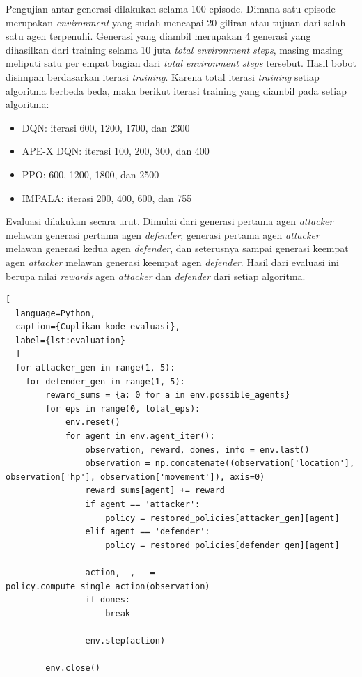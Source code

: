 Pengujian antar generasi dilakukan selama 100 episode.
Dimana satu episode merupakan \emph{environment} yang sudah mencapai 20 giliran atau tujuan dari salah satu agen terpenuhi.
Generasi yang diambil merupakan 4 generasi yang dihasilkan dari training selama 10 juta \emph{total environment steps},
masing masing meliputi satu per empat bagian dari \emph{total environment steps} tersebut.
Hasil bobot disimpan berdasarkan iterasi \emph{training}.
Karena total iterasi \emph{training} setiap algoritma berbeda beda, maka berikut iterasi training yang diambil pada setiap algoritma:
\begin{itemize}
  \item DQN: iterasi 600, 1200, 1700, dan 2300
  \item APE-X DQN: iterasi 100, 200, 300, dan 400
  \item PPO: 600, 1200, 1800, dan 2500
  \item IMPALA: iterasi 200, 400, 600, dan 755
\end{itemize}

Evaluasi dilakukan secara urut. 
Dimulai dari generasi pertama agen \emph{attacker} melawan generasi pertama agen \emph{defender},
generasi pertama agen \emph{attacker} melawan generasi kedua agen \emph{defender}, 
dan seterusnya sampai generasi keempat agen \emph{attacker} melawan generasi keempat agen \emph{defender}.
Hasil dari evaluasi ini berupa nilai \emph{rewards} agen \emph{attacker} dan \emph{defender} dari setiap algoritma.

\begin{lstlisting}[
  language=Python,
  caption={Cuplikan kode evaluasi},
  label={lst:evaluation}
  ]
  for attacker_gen in range(1, 5):
    for defender_gen in range(1, 5):
        reward_sums = {a: 0 for a in env.possible_agents}
        for eps in range(0, total_eps):
            env.reset()
            for agent in env.agent_iter():
                observation, reward, dones, info = env.last()
                observation = np.concatenate((observation['location'], observation['hp'], observation['movement']), axis=0)
                reward_sums[agent] += reward
                if agent == 'attacker':
                    policy = restored_policies[attacker_gen][agent]
                elif agent == 'defender':
                    policy = restored_policies[defender_gen][agent]

                action, _, _ = policy.compute_single_action(observation)
                if dones:
                    break

                env.step(action)

        env.close()
\end{lstlisting}

